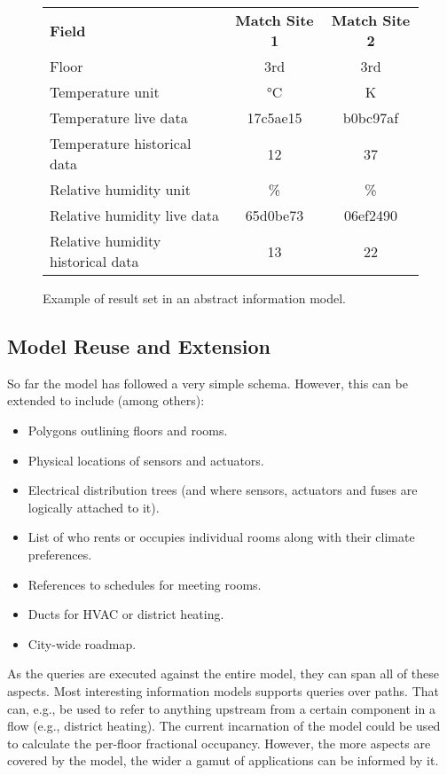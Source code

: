 \begin{figure}[tbp]
  \centering
  \begin{tabular}{lcc}
    \textbf{Field} & \textbf{Match Site 1} & \textbf{Match Site 2} \\
    Floor & 3rd & 3rd \\
    Temperature unit & \si{\degreeCelsius} & \si{\kelvin} \\
    Temperature live data & 17c5ae15 & b0bc97af \\
    Temperature historical data & 12 & 37 \\
    Relative humidity unit & \si{\percent} & \si{\percent} \\
    Relative humidity live data & 65d0be73 & 06ef2490 \\
    Relative humidity historical data & 13 & 22 \\
  \end{tabular}
  \caption{Example of result set in an abstract information model.}
  \label{fig:topics:info:resultset}
\end{figure}

\subsection{Model Reuse and Extension}

So far the model has followed a very simple schema. However, this can be extended to include (among others):
\begin{itemize}
  \item Polygons outlining floors and rooms.
  \item Physical locations of sensors and actuators.
  \item Electrical distribution trees (and where sensors, actuators and fuses are logically attached to it).
  \item List of who rents or occupies individual rooms along with their climate preferences.
  \item References to schedules for meeting rooms.
  \item Ducts for HVAC or district heating.
  \item City-wide roadmap.
\end{itemize}

As the queries are executed against the entire model, they can span all of these aspects. Most interesting information models supports queries over paths. That can, e.g., be used to refer to anything upstream from a certain component in a flow (e.g., district heating). The current incarnation of the model could be used to calculate the per-floor fractional occupancy. However, the more aspects are covered by the model, the wider a gamut of applications can be informed by it.

